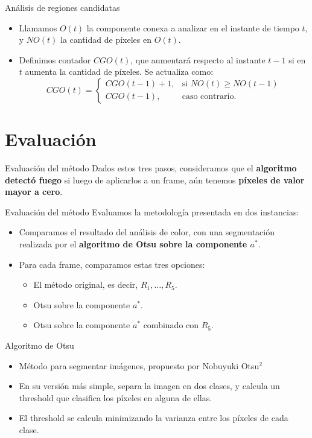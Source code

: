 \documentclass{beamer}
\begin{document}
\begin{frame}{Análisis de regiones candidatas}
    \begin{itemize}
        \item Llamamos $O(t)$ la componente conexa a analizar en el instante de tiempo $t$, y $NO(t)$ la cantidad de píxeles en $O(t)$.
        \item Definimos contador $CGO(t)$, que aumentará respecto al instante $t-1$ si en $t$ aumenta la cantidad de píxeles. Se actualiza como:
                \[
        CGO(t) =
        \begin{cases}
        CGO(t-1) + 1, & \text{si } NO(t) \geq NO(t-1) \\
        CGO(t-1), & \text{caso contrario.}
        \end{cases}
        \]
    \end{itemize}
\end{frame}

 \section{Evaluación}
\begin{frame}{Evaluación del método}
    Dados estos tres pasos, consideramos que el \textbf{algoritmo detectó fuego} si luego de aplicarlos a un frame, aún tenemos \textbf{píxeles de valor mayor a cero}.
\end{frame}
 
 \begin{frame}{Evaluación del método}
 Evaluamos la metodología presentada en dos instancias:
 \begin{itemize}
     \item Comparamos el resultado del análisis de color, con una segmentación realizada por el \textbf{algoritmo de Otsu sobre la componente $a^*$}.
     \item Para cada frame, comparamos estas tres opciones:
    \begin{itemize}
        \item El método original, es decir, $R_1, \dots, R_5$.
        \item Otsu sobre la componente $a^*$.
        \item Otsu sobre la componente $a^*$ combinado con $R_5$.
    \end{itemize}
 \end{itemize}
 \end{frame}
 
\begin{frame}{Algoritmo de Otsu}
\begin{itemize}
    \item Método para segmentar imágenes, propuesto por Nobuyuki Otsu$^2$
    \item En su versión más simple, separa la imagen en dos clases, y calcula un threshold que clasifica los píxeles en alguna de ellas.
    \item El threshold se calcula minimizando la varianza entre los píxeles de cada clase.
\end{itemize}
\end{frame}
\end{document}
